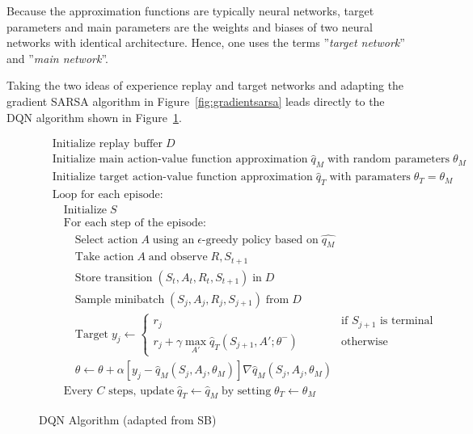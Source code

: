 Because the approximation functions are typically neural networks, target parameters and main parameters are the weights and biases of two neural networks with identical architecture. Hence, one uses the terms ''\emph{target network}'' and ''\emph{main network}''.

Taking the two ideas of experience replay and target networks and adapting the gradient SARSA algorithm in Figure~\ref{fig:gradientsarsa} leads directly to the DQN algorithm shown in Figure~\ref{fig:dqn}.

\begin{figure}
\small
\begin{tcolorbox}[colback=code]
\vspace{-\baselineskip}
\begin{align*}
& \text{Initialize replay buffer}\;D \\
& \text{Initialize main action-value function approximation}\;\hat{q}_M\;\text{with random parameters}\;\theta_M \\
& \text{Initialize target action-value function approximation}\;\hat{q}_T\;\text{with paramaters}\;\theta_T=\theta_M \\
& \text{Loop for each episode:}\\
& \quad \text{Initialize}\;S \\
& \quad \text{For each step of the episode:} \\
& \quad \quad \text{Select action}\; A \; \text{using an} \; \text{$\epsilon$-greedy policy based on}\; \hat{q_M}\\
& \quad \quad \text{Take action} \; A \; \text{and observe}\;R, S_{t+1} \\
& \quad \quad \text{Store transition} \; (S_t , A_t , R_t , S_{t+1} ) \; \text{in} \; D \\
& \quad \quad \text{Sample minibatch} \; (S_j , A_j , R_j , S_{j+1} ) \; \text{from} \; D \\
& \quad \quad \text{Target}\;y_j \leftarrow \begin{cases} r_j & \qquad \quad \text{if $S_{j+1}$ is terminal} \\
r_j + \gamma \operatorname*{max}_{A'} \hat{q}_T(S_{j+1}, A'; \theta^-) & \qquad \quad \text{otherwise}\end{cases} \\
& \quad \quad \theta \leftarrow \theta + \alpha [y_j - \hat{q}_M (S_j, A_j, \theta_M)] \nabla \hat{q}_M(S_j, A_j, \theta_M) \hspace{1in} \\
& \quad \text{Every $C$ steps, update}\; \hat{q}_T \leftarrow \hat{q}_M\;\text{by setting}\; \theta_T \leftarrow \theta_M
\end{align*}
\end{tcolorbox}
\caption{DQN Algorithm (adapted from SB)}
\label{fig:dqn}
\end{figure}

